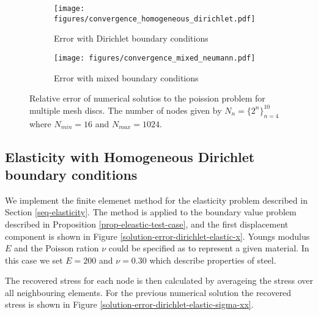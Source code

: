 \documentclass[a4paper,english]{elsarticle}%
\begin{document}
\begin{figure}[t]
\begin{subfigure}[t]{0.5\linewidth}
        \centering
            \texttt{[image: figures/convergence\_homogeneous\_dirichlet.pdf]}
        \caption{Error with Dirichlet boundary conditions}
        \label{convergence-dirichlet}
    \end{subfigure}\qquad
    \begin{subfigure}[t]{0.5\linewidth}
        \centering
            \texttt{[image: figures/convergence\_mixed\_neumann.pdf]}
        \caption{Error with mixed boundary conditions}
        \label{convergence-neumann}
    \end{subfigure}
    \label{fig-convergence}
    \caption{Relative error of numerical solutios to the poission problem for multiple mesh discs. The number of nodes given by $N_n = \{ 2^n\}_{n=4}^{10}$
    where $N_{min} = 16$ and $N_{max} = 1024$.}
\end{figure}


\subsection{Elasticity with Homogeneous Dirichlet boundary conditions}
We implement the finite elemenet method for the elasticity problem described in Section \ref{seq-elasticity}. The method is applied to the boundary value problem described in Proposition \eqref{prop-eleastic-test-case}, and the first displacement component is shown in Figure \ref{solution-error-dirichlet-elastic-x}. Youngs modulus $E$ and the Poisson ration $\nu$ could be specified as to represent a given material. In this case we set $E = 200$ and $\nu = 0.30$ which describe properties of steel. 

The recovered stress for each node is then calculated by averageing the stress over all neighbouring elements. For the previous numerical solution the recovered stress is shown in Figure \ref{solution-error-dirichlet-elastic-sigma-xx}. 
\end{document}
